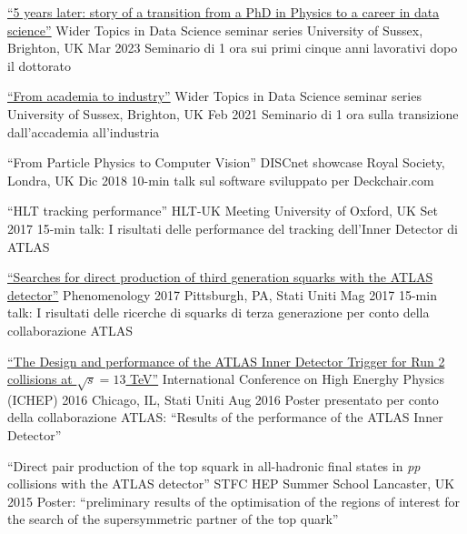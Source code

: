 \begin{cventries}
  \cventry
    {\href{https://www.linkedin.com/in/fabriziomiano/}{``5 years later: story of a transition from a PhD in Physics to a career in data science''}}
    {Wider Topics in Data Science seminar series}
    {University of Sussex, Brighton, UK}
    {Mar 2023}
    {Seminario di 1 ora sui primi cinque anni lavorativi dopo il dottorato}

  \cventry
    {\href{https://www.linkedin.com/in/fabriziomiano/}{``From academia to industry''}}
    {Wider Topics in Data Science seminar series}
    {University of Sussex, Brighton, UK}
    {Feb 2021}
    {Seminario di 1 ora sulla transizione dall'accademia all'industria}

  \cventry
    {``From Particle Physics to Computer Vision''}
    {DISCnet showcase}
    {Royal Society, Londra, UK}
    {Dic 2018}
    {10-min talk sul software sviluppato per Deckchair.com}

  \cventry
    {``HLT tracking performance''}
    {HLT-UK Meeting}
    {University of Oxford, UK}
    {Set 2017}
    {15-min talk: I risultati delle performance del tracking dell'Inner Detector di ATLAS }

  \cventry
    {
    \href{http://cds.cern.ch/record/2263055/files/ATL-PHYS-SLIDE-2017-220.pdf}{``Searches for direct production of third generation squarks with the ATLAS detector''}
    }
    {Phenomenology 2017}
    {Pittsburgh, PA, Stati Uniti}
    {Mag 2017}
    {15-min talk: I risultati delle ricerche di squarks di terza generazione per conto della collaborazione ATLAS}

  \cventry
    {
    \href{https://indico.cern.ch/event/432527/contributions/1071672/attachments/1317672/1974610/FMiano-IDTrigger-ICHEP.pdf}
    {``The Design and performance of the ATLAS Inner Detector Trigger for Run 2 collisions at $\sqrt{s} = 13$ TeV''}
    }
    {International Conference on High Energhy Physics (ICHEP) 2016}
    {Chicago, IL, Stati Uniti}
    {Aug 2016}
    {Poster presentato per conto della collaborazione ATLAS: ``Results of the performance of the ATLAS Inner Detector''}

  \cventry
    {``Direct pair production of the top squark in all-hadronic final states in \emph{pp} collisions with the ATLAS detector''}
    {STFC HEP Summer School}
    {Lancaster, UK}
    {2015}
    {Poster: ``preliminary results of the optimisation of the regions of interest for the search of the supersymmetric partner of the top quark''}

\end{cventries}